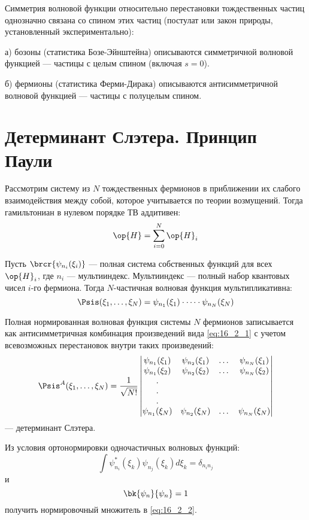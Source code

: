 Симметрия волновой функции относительно перестановки тождественных частиц однозначно связана со спином этих частиц (постулат или закон природы, установленный экспериментально):

а) бозоны (статистика Бозе-Эйнштейна) описываются симметричной волновой функцией --- частицы с целым спином (включая $s = 0$).

б) фермионы (статистика Ферми-Дирака) описываются антисимметричной волновой функцией --- частицы с полуцелым спином.

\section{Детерминант Слэтера. Принцип Паули}

Рассмотрим систему из $N$ тождественных фермионов в приближении их слабого взаимодействия между собой, которое учитывается по теории возмущений. Тогда гамильтониан в нулевом порядке ТВ аддитивен:
$$
\op{H} = \sum_{i=0}^N\op{H}_i
$$

Пусть $\brcr{\psi_{n_i}(\xi_i)}$ --- полная система собственных функций для всех $\op{H}_i$, где $n_i$ --- мультииндекс. Мультииндекс --- полный набор квантовых чисел $i$-го фермиона. Тогда $N$-частичная волновая функция мультипликативна:
\begin{equation}
\label{eq:16_2_1}
\Psis(\xi_1, \dots, \xi_N) = \psi_{n_1}(\xi_1) \cdot \dots \cdot \psi_{n_N}(\xi_N)
\end{equation}

Полная нормированная волновая функция системы $N$ фермионов записывается как антисимметричная комбинация произведений вида \eqref{eq:16_2_1} с учетом всевозможных перестановок внутри таких произведений:
\begin{equation}
\label{eq:16_2_2}
\Psis^A(\xi_1, \dots, \xi_N) = \frac{1}{\sqrt{N!}} \left |
  \begin{matrix} 
  \psi_{n_1}(\xi_1) & \psi_{n_2}(\xi_1) & \dots &  \psi_{n_N}(\xi_1) \\
  \psi_{n_1}(\xi_2) & \psi_{n_2}(\xi_2) & \dots &  \psi_{n_N}(\xi_2) \\
  .                                &                                  &    &                                    \\
  .                                &                                  &    &                                    \\
  .                                &                                  &    &                                    \\
  \psi_{n_1}(\xi_N) & \psi_{n_2}(\xi_N) & \dots &  \psi_{n_N}(\xi_N)
  \end{matrix} \right |
\end{equation}
--- детерминант Слэтера.
\begin{excr}

Из условия ортонормировки одночастичных волновых функций: 
$$
\int \psi_{n_i}^*(\xi_k) \psi_{n_j}(\xi_k) d\xi_k = \delta_{n_i n_j}
$$
и 
$$
\bk{\psi_n}{\psi_n} = 1
$$
получить нормировочный множитель в \eqref{eq:16_2_2}.
\end{excr}

